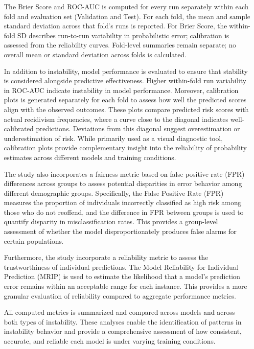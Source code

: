 \documentclass[12pt]{article}
\begin{document}
\begin{enumerate}
  The Brier Score and ROC-AUC is computed for every run separately within each fold and evaluation set (Validation and Test). For each fold, the mean and sample standard deviation across that fold's runs is reported. For Brier Score, the within-fold SD describes run-to-run variability in probabilistic error; calibration is assessed from the reliability curves. Fold-level summaries remain separate; no overall mean or standard deviation across folds is calculated.

  In addition to instability, model performance is evaluated to ensure that stability is considered alongside predictive effectiveness. Higher within-fold run variability in ROC-AUC indicate instability in model performance. Moreover, calibration plots is generated separately for each fold to assess how well the predicted scores align with the observed outcomes. These plots compare predicted risk scores with actual recidivism frequencies, where a curve close to the diagonal indicates well-calibrated predictions. Deviations from this diagonal suggest overestimation or underestimation of risk. While primarily used as a visual diagnostic tool, calibration plots provide complementary insight into the reliability of probability estimates across different models and training conditions.

  The study also incorporates a fairness metric based on false positive rate (FPR) differences across groups to assess potential disparities in error behavior among different demographic groups. Specifically, the False Positive Rate (FPR) measures the proportion of individuals incorrectly classified as high risk among those who do not reoffend, and the difference in FPR between groups is used to quantify disparity in misclassification rates. This provides a group-level assessment of whether the model disproportionately produces false alarms for certain populations.

  Furthermore, the study incorporate a reliability metric to assess the trustworthiness of individual predictions. The Model Reliability for Individual Prediction (MRIP) is used to estimate the likelihood that a model's prediction error remains within an acceptable range for each instance. This provides a more granular evaluation of reliability compared to aggregate performance metrics.

  All computed metrics is summarized and compared across models and across both types of instability. These analyses enable the identification of patterns in instability behavior and provide a comprehensive assessment of how consistent, accurate, and reliable each model is under varying training conditions.


\end{enumerate}
\end{document}
